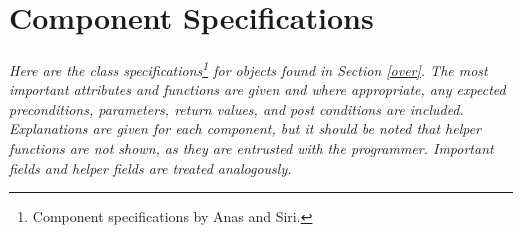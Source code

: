 \documentclass[12pt]{article}
\begin{document}
%
%
%

\section{Component Specifications} \label{specs}
\paragraph{} \textit{Here are the class specifications\footnote{Component specifications by Anas and Siri.} for objects 
found in Section \ref{over}. The most important attributes and functions are given and where appropriate, any expected 
preconditions, parameters, return values, and post conditions are included. Explanations are given for each component, but 
it should be noted that helper functions are not shown, as they are entrusted with the programmer. Important fields and helper
fields are treated analogously.}
\end{document}

